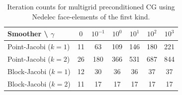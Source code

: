 \documentclass[presentation,aspectratio=43, 10pt]{beamer}
\newcommand{\convexpath}[2]{
  [
  create hullcoords/.code={
    \global\edef\namelist{#1}
    \foreach [count=\counter] \nodename in \namelist {
      \global\edef\numberofnodes{\counter}
      \coordinate (hullcoord\counter) at (\nodename);
    }
    \coordinate (hullcoord0) at (hullcoord\numberofnodes);
    \pgfmathtruncatemacro\lastnumber{\numberofnodes+1}
    \coordinate (hullcoord\lastnumber) at (hullcoord1);
  },
  create hullcoords
  ]
  ($(hullcoord1)!#2!-90:(hullcoord0)$)
  \foreach [
  evaluate=\currentnode as \previousnode using \currentnode-1,
  evaluate=\currentnode as \nextnode using \currentnode+1
  ] \currentnode in {1,...,\numberofnodes} {
    let \p1 = ($(hullcoord\currentnode) - (hullcoord\previousnode)$),
    \n1 = {atan2(\y1,\x1) + 90},
    \p2 = ($(hullcoord\nextnode) - (hullcoord\currentnode)$),
    \n2 = {atan2(\y2,\x2) + 90},
    \n{delta} = {Mod(\n2-\n1,360) - 360}
    in
    {arc [start angle=\n1, delta angle=\n{delta}, radius=#2]}
    -- ($(hullcoord\nextnode)!#2!-90:(hullcoord\currentnode)$)
  }
}
\begin{document}
\begin{frame}[fragile,t]
\begin{columns}
\begin{column}{0.3\textwidth}
\begin{center}
      \end{center}
    \end{column}
  \end{columns}    
  \begin{center}
    \begin{table}
      \begin{tabular}{l|cccccc}
        Smoother \textbackslash{} $\gamma$ & $0$ & $10^{-1}$ & $10^{0}$ & $10^{1}$ & $10^{2}$ & $10^{3}$ \\
        \midrule
        Point-Jacobi ($k=1$)  & 11 & 63  & 109 & 146 & 180 & 221 \\
        Point-Jacobi  ($k=2$) & 26 & 180 & 366 & 531 & 687 & 844 \\
        \midrule
        Block-Jacobi  ($k=1$) & 12 & 30  &  36 & 36  &  37 & 37  \\
        Block-Jacobi  ($k=2$) & 11 & 17  &  17 & 17  &  17 & 17
      \end{tabular}
      \caption{Iteration counts for multigrid preconditioned CG using Nedelec face-elements of the first kind.}
    \end{table}
    \end{center}
\end{frame}
\end{document}
